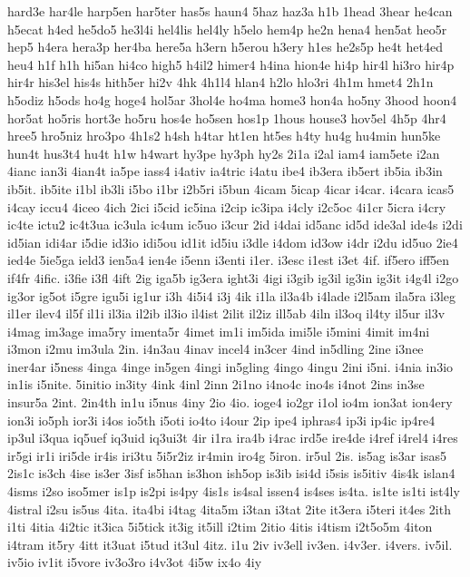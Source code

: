 {hard3e
har4le
harp5en
har5ter
has5s
haun4
5haz
haz3a
h1b
1head
3hear
he4can
h5ecat
h4ed
he5do5
he3l4i
hel4lis
hel4ly
h5elo
hem4p
he2n
hena4
hen5at
heo5r
hep5
h4era
hera3p
her4ba
here5a
h3ern
h5erou
h3ery
h1es
he2s5p
he4t
het4ed
heu4
h1f
h1h
hi5an
hi4co
high5
h4il2
himer4
h4ina
hion4e
hi4p
hir4l
hi3ro
hir4p
hir4r
his3el
his4s
hith5er
hi2v
4hk
4h1l4
hlan4
h2lo
hlo3ri
4h1m
hmet4
2h1n
h5odiz
h5ods
ho4g
hoge4
hol5ar
3hol4e
ho4ma
home3
hon4a
ho5ny
3hood
hoon4
hor5at
ho5ris
hort3e
ho5ru
hos4e
ho5sen
hos1p
1hous
house3
hov5el
4h5p
4hr4
hree5
hro5niz
hro3po
4h1s2
h4sh
h4tar
ht1en
ht5es
h4ty
hu4g
hu4min
hun5ke
hun4t
hus3t4
hu4t
h1w
h4wart
hy3pe
hy3ph
hy2s
2i1a
i2al
iam4
iam5ete
i2an
4ianc
ian3i
4ian4t
ia5pe
iass4
i4ativ
ia4tric
i4atu
ibe4
ib3era
ib5ert
ib5ia
ib3in
ib5it.
ib5ite
i1bl
ib3li
i5bo
i1br
i2b5ri
i5bun
4icam
5icap
4icar
i4car.
i4cara
icas5
i4cay
iccu4
4iceo
4ich
2ici
i5cid
ic5ina
i2cip
ic3ipa
i4cly
i2c5oc
4i1cr
5icra
i4cry
ic4te
ictu2
ic4t3ua
ic3ula
ic4um
ic5uo
i3cur
2id
i4dai
id5anc
id5d
ide3al
ide4s
i2di
id5ian
idi4ar
i5die
id3io
idi5ou
id1it
id5iu
i3dle
i4dom
id3ow
i4dr
i2du
id5uo
2ie4
ied4e
5ie5ga
ield3
ien5a4
ien4e
i5enn
i3enti
i1er.
i3esc
i1est
i3et
4if.
if5ero
iff5en
if4fr
4ific.
i3fie
i3fl
4ift
2ig
iga5b
ig3era
ight3i
4igi
i3gib
ig3il
ig3in
ig3it
i4g4l
i2go
ig3or
ig5ot
i5gre
igu5i
ig1ur
i3h
4i5i4
i3j
4ik
i1la
il3a4b
i4lade
i2l5am
ila5ra
i3leg
il1er
ilev4
il5f
il1i
il3ia
il2ib
il3io
il4ist
2ilit
il2iz
ill5ab
4iln
il3oq
il4ty
il5ur
il3v
i4mag
im3age
ima5ry
imenta5r
4imet
im1i
im5ida
imi5le
i5mini
4imit
im4ni
i3mon
i2mu
im3ula
2in.
i4n3au
4inav
incel4
in3cer
4ind
in5dling
2ine
i3nee
iner4ar
i5ness
4inga
4inge
in5gen
4ingi
in5gling
4ingo
4ingu
2ini
i5ni.
i4nia
in3io
in1is
i5nite.
5initio
in3ity
4ink
4inl
2inn
2i1no
i4no4c
ino4s
i4not
2ins
in3se
insur5a
2int.
2in4th
in1u
i5nus
4iny
2io
4io.
ioge4
io2gr
i1ol
io4m
ion3at
ion4ery
ion3i
io5ph
ior3i
i4os
io5th
i5oti
io4to
i4our
2ip
ipe4
iphras4
ip3i
ip4ic
ip4re4
ip3ul
i3qua
iq5uef
iq3uid
iq3ui3t
4ir
i1ra
ira4b
i4rac
ird5e
ire4de
i4ref
i4rel4
i4res
ir5gi
ir1i
iri5de
ir4is
iri3tu
5i5r2iz
ir4min
iro4g
5iron.
ir5ul
2is.
is5ag
is3ar
isas5
2is1c
is3ch
4ise
is3er
3isf
is5han
is3hon
ish5op
is3ib
isi4d
i5sis
is5itiv
4is4k
islan4
4isms
i2so
iso5mer
is1p
is2pi
is4py
4is1s
is4sal
issen4
is4ses
is4ta.
is1te
is1ti
ist4ly
4istral
i2su
is5us
4ita.
ita4bi
i4tag
4ita5m
i3tan
i3tat
2ite
it3era
i5teri
it4es
2ith
i1ti
4itia
4i2tic
it3ica
5i5tick
it3ig
it5ill
i2tim
2itio
4itis
i4tism
i2t5o5m
4iton
i4tram
it5ry
4itt
it3uat
i5tud
it3ul
4itz.
i1u
2iv
iv3ell
iv3en.
i4v3er.
i4vers.
iv5il.
iv5io
iv1it
i5vore
iv3o3ro
i4v3ot
4i5w
ix4o
4iy
}

